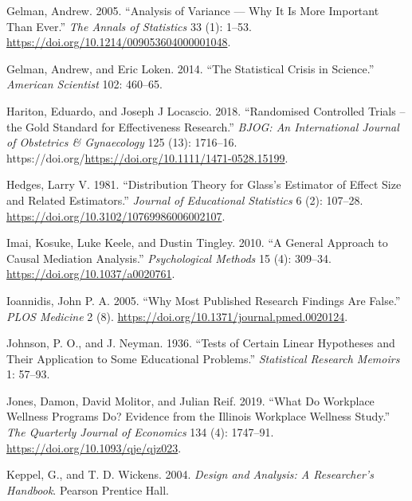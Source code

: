 \documentclass[
  11pt,
  letterpaper,
]{scrbook}
\newlength{\cslhangindent}
\newlength{\cslentryspacingunit} %
\newenvironment{CSLReferences}[2] %
 {%
  \setlength{\parindent}{0pt}
  \ifodd #1
  \let\oldpar\par
  \def\par{\hangindent=\cslhangindent\oldpar}
  \fi
  \setlength{\parskip}{#2\cslentryspacingunit}
 }%
 {}
\theoremstyle{definition}
\theoremstyle{remark}
\begin{document}
\begin{CSLReferences}{1}{0}
\leavevmode{}%
Gelman, Andrew. 2005. {``Analysis of Variance --- Why It Is More
Important Than Ever.''} \emph{The Annals of Statistics} 33 (1): 1--53.
\url{https://doi.org/10.1214/009053604000001048}.

\leavevmode{}%
Gelman, Andrew, and Eric Loken. 2014. {``The Statistical Crisis in
Science.''} \emph{American Scientist} 102: 460--65.

\leavevmode{}%
Hariton, Eduardo, and Joseph J Locascio. 2018. {``Randomised Controlled
Trials -- the Gold Standard for Effectiveness Research.''} \emph{BJOG:
An International Journal of Obstetrics \& Gynaecology} 125 (13):
1716--16. https://doi.org/\url{https://doi.org/10.1111/1471-0528.15199}.

\leavevmode{}%
Hedges, Larry V. 1981. {``Distribution Theory for {G}lass's Estimator of
Effect Size and Related Estimators.''} \emph{Journal of Educational
Statistics} 6 (2): 107--28.
\url{https://doi.org/10.3102/10769986006002107}.

\leavevmode{}%
Imai, Kosuke, Luke Keele, and Dustin Tingley. 2010. {``A General
Approach to Causal Mediation Analysis.''} \emph{Psychological Methods}
15 (4): 309--34. \url{https://doi.org/10.1037/a0020761}.

\leavevmode{}%
Ioannidis, John P. A. 2005. {``Why Most Published Research Findings Are
False.''} \emph{PLOS Medicine} 2 (8).
\url{https://doi.org/10.1371/journal.pmed.0020124}.

\leavevmode{}%
Johnson, P. O., and J. Neyman. 1936. {``Tests of Certain Linear
Hypotheses and Their Application to Some Educational Problems.''}
\emph{Statistical Research Memoirs} 1: 57--93.

\leavevmode{}%
Jones, Damon, David Molitor, and Julian Reif. 2019. {``What Do Workplace
Wellness Programs Do? Evidence from the {I}llinois Workplace Wellness
Study.''} \emph{The Quarterly Journal of Economics} 134 (4): 1747--91.
\url{https://doi.org/10.1093/qje/qjz023}.

\leavevmode{}%
Keppel, G., and T. D. Wickens. 2004. \emph{Design and Analysis: A
Researcher's Handbook}. Pearson Prentice Hall.


\end{CSLReferences}
\end{document}

